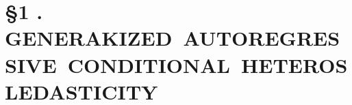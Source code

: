 \documentclass{jsarticle}
\newcommand{\Section}[2]{\section*{\S #1 .\hspace{5pt} #2}}
\begin{document}
\Section{1}{GENERAKIZED\ AUTOREGRESSIVE\ CONDITIONAL\ HETEROSLEDASTICITY}
\end{document}

